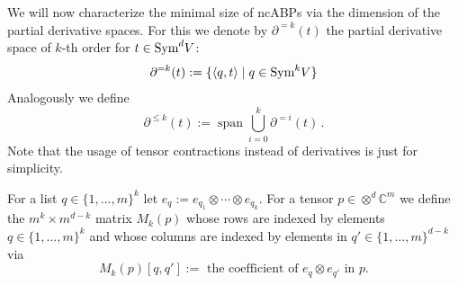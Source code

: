 \documentclass[10pt,a4paper]{article}
\numberwithin{equation}{section}
\theoremstyle{definition}
\newcommand{\Sym}{\textup{Sym}}
\newcommand{\IC}{\mathbb{C}}
\DeclareMathOperator{\spn}{span}
\begin{document}
We will now characterize the minimal size of ncABPs via the dimension of the partial derivative spaces.
For this we denote by $\partial^{=k}(t)$ the partial derivative space of $k$-th order for $t \in \Sym^d V$:
\[
    \partial^{=k}(t) := \{ \langle q, t \rangle \mid q \in \Sym^k V\}
\]
Analogously we define
\[
    \partial^{\leq k}(t) := \spn \bigcup_{i = 0}^k \partial^{=i}(t)\,.
\]
Note that the usage of tensor contractions instead of derivatives is just for simplicity.

For a list $q \in \{1,\ldots,m\}^k$ let $e_q := e_{q_1} \otimes \cdots \otimes e_{q_k}$.
For a tensor $p \in \otimes^d \IC^m$ we define the $m^k \times m^{d-k}$ matrix $M_k(p)$ whose rows are indexed by elements $q \in \{1,\ldots,m\}^k$ and whose columns are indexed by elements in $q' \in \{1,\ldots,m\}^{d-k}$ via
\begin{equation}\label{eq:Mk}
M_k(p)[q, q'] := \text{ the coefficient of $e_q \otimes e_{q'}$ in $p$}.
\end{equation}
\end{document}
